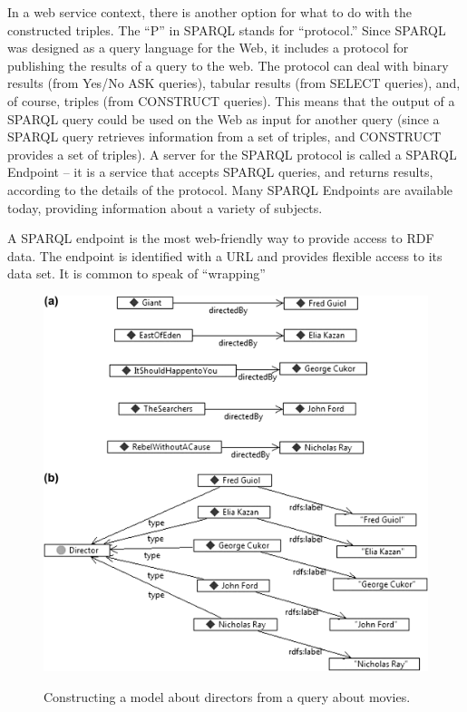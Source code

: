In a web service context, there is another option for what to do with
the constructed triples. The ``P'' in SPARQL stands for ``protocol.''
Since SPARQL was designed as a query language for the Web, it includes a
protocol for publishing the results of a query to the web. The protocol
can deal with binary results (from Yes/No ASK queries), tabular results
(from SELECT queries), and, of course, triples (from CONSTRUCT queries).
This means that the output of a SPARQL query could be used on the Web as
input for another query (since a SPARQL query retrieves information from
a set of triples, and CONSTRUCT provides a set of triples). A server for
the SPARQL protocol is called a SPARQL Endpoint -- it is a service that
accepts SPARQL queries, and returns results, according to the details of
the protocol. Many SPARQL Endpoints are available today, providing
information about a variety of subjects. 


A SPARQL endpoint is the most web-friendly way to provide access to RDF
data. The endpoint is identified with a URL and provides flexible access
to its data set. It is common to speak of ``wrapping''

\begin{figure}
\centering
\includegraphics[width=5in]{media/ch6/f06-08.png}
\label{fig:ch6.8}
\caption{Constructing a model about directors from a query about movies.}
\end{figure}

